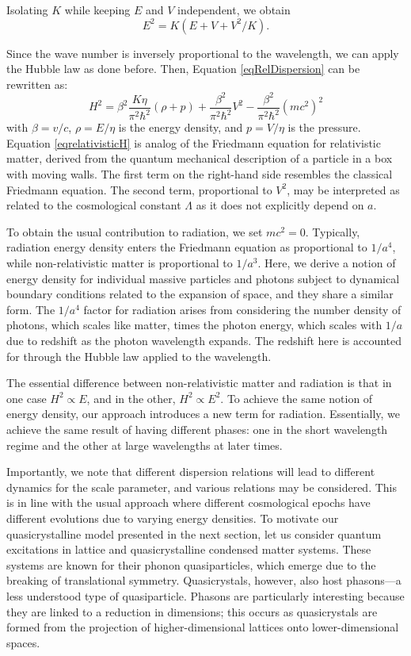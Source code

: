 \documentclass{article}
\begin{document}
Isolating $K$ while keeping $E$ and $V$ independent, we obtain 
\begin{equation}
E^{2}=K(E+V+V^{2}/K).\label{E2expanded}
\end{equation}

Since the wave number is inversely proportional to the wavelength, we can apply the Hubble law as done before.  Then, Equation \ref{eqRelDispersion} can be rewritten as:
\begin{equation}
H^{2}=\beta^{2}\frac{K\eta}{\pi^{2}\hbar^{2}}(\rho+p)+\frac{\beta^{2}}{\pi^{2}\hbar^{2}}V^{2}-\frac{\beta^{2}}{\pi^{2}\hbar^{2}}(mc^{2})^{2}\label{eqrelativisticH}
\end{equation}
with $\beta=v/c$, $\rho = E/\eta$ is the energy density, and $p = V/\eta$ is the pressure. Equation \ref{eqrelativisticH} is analog of the Friedmann equation for relativistic matter, derived from the quantum mechanical description of a particle in a box with moving walls. The first term on the right-hand side resembles the classical Friedmann equation. The second term, proportional to $V^2$, may be interpreted as related to the cosmological constant $\Lambda$ as it does not explicitly depend on $a$.


To obtain the usual contribution to radiation, we set $mc^2 = 0$. Typically, radiation energy density enters the Friedmann equation as proportional to $1/a^4$, while non-relativistic matter is proportional to $1/a^3$. Here, we derive a notion of energy density for individual massive particles and photons subject to dynamical boundary conditions related to the expansion of space, and they share a similar form. The $1/a^4$ factor for radiation arises from considering the number density of photons, which scales like matter, times the photon energy, which scales with $1/a$ due to redshift as the photon wavelength expands. The redshift here is accounted for through the Hubble law applied to the wavelength.

The essential difference between non-relativistic matter and radiation is that in one case $H^2 \propto E$, and in the other, $H^2 \propto E^2$. To achieve the same notion of energy density, our approach introduces a new term for radiation. Essentially, we achieve the same result of having different phases: one in the short wavelength regime and the other at large wavelengths at later times.

Importantly, we note that different dispersion relations will lead to different dynamics for the scale parameter, and various relations may be considered. This is in line with the usual approach where different cosmological epochs have different evolutions due to varying energy densities. To motivate our quasicrystalline model presented in the next section, let us consider quantum excitations in lattice and quasicrystalline condensed matter systems. These systems are known for their phonon quasiparticles, which emerge due to the breaking of translational symmetry. Quasicrystals, however, also host phasons—a less understood type of quasiparticle. Phasons are particularly interesting because they are linked to a reduction in dimensions; this occurs as quasicrystals are formed from the projection of higher-dimensional lattices onto lower-dimensional spaces.
\end{document}
